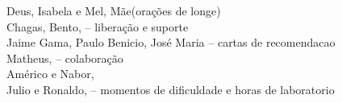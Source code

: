 \begin{agradecimentos}
Deus, Isabela e Mel, Mãe(orações de longe)\\ 
Chagas, Bento, -- liberação e suporte\\
Jaime Gama, Paulo Benicio, José Maria -- cartas de recomendacao\\
Matheus, -- colaboração\\
Américo e Nabor,\\
Julio e Ronaldo, -- momentos de dificuldade e horas de laboratorio\\
\end{agradecimentos}
